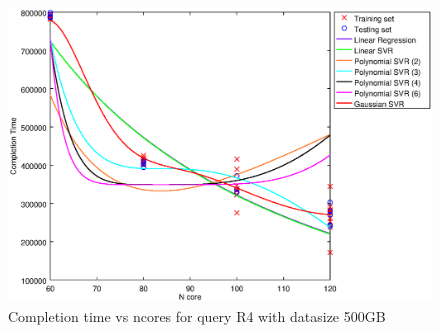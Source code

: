 
\begin {figure}[hbtp]
\centering
\includegraphics[width=\textwidth]{output/R4_500_ONLY_1_OVER_NCORES/plot_R4_500.eps}
\caption{Completion time vs ncores for query R4 with datasize 500GB}
\label{fig:all_nonlinear_R4_500}
\end {figure}
